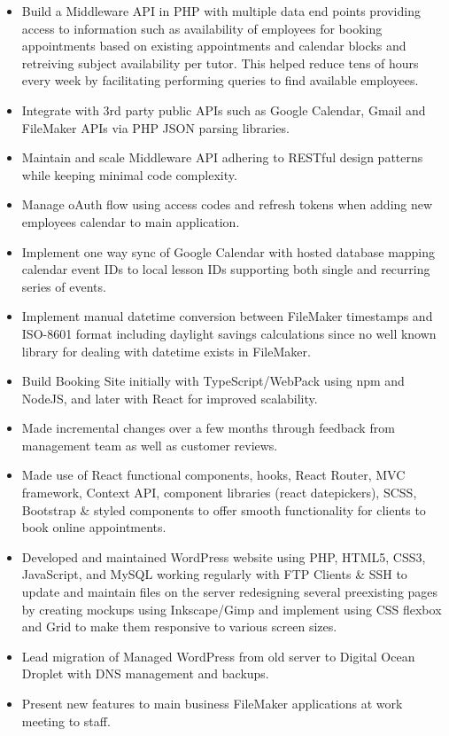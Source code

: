 \documentclass{resume}
\begin{document}
\begin{itemize}
\vspace{5pt}

\item \small \raggedright Build a Middleware API in PHP with multiple data end points providing access to information such as availability of employees for booking appointments based on existing appointments and calendar blocks and retreiving subject availability per tutor. This helped reduce tens of hours every week by facilitating performing queries to find available employees.
\item \small \raggedright Integrate with 3rd party public APIs such as Google Calendar, Gmail and FileMaker APIs via PHP JSON parsing libraries.
\item \small \raggedright Maintain and scale Middleware API adhering to RESTful design patterns while keeping minimal code complexity.
\item \small \raggedright Manage oAuth flow using access codes and refresh tokens when adding new employees calendar to main application.
\item \small \raggedright Implement one way sync of Google Calendar with hosted database mapping calendar event IDs to local lesson IDs supporting both single and recurring series of events.
\item \small \raggedright Implement manual datetime conversion between FileMaker timestamps and ISO-8601 format including daylight savings calculations since no well known library for dealing with datetime exists in FileMaker.

\vspace{5pt}

\item \small \raggedright Build Booking Site initially with TypeScript/WebPack using npm and NodeJS, and later with React for improved scalability.
\item \small \raggedright Made incremental changes over a few months through feedback from management team as well as customer reviews.
\item \small \raggedright Made use of React functional components, hooks, React Router, MVC framework, Context API, component libraries (react datepickers), SCSS, Bootstrap \& styled components to offer smooth functionality for clients to book online appointments.
\item \small \raggedright Developed and maintained WordPress website using PHP, HTML5, CSS3, JavaScript, and MySQL working regularly with FTP Clients \& SSH to update and maintain files on the server redesigning several preexisting pages by creating mockups using Inkscape/Gimp and implement using CSS flexbox and Grid to make them responsive to various screen sizes.
\item \small \raggedright Lead migration of Managed WordPress from old server to Digital Ocean Droplet with DNS management and backups.
\item \small \raggedright Present new features to main business FileMaker applications at work meeting to staff.
\end{itemize}
\end{document}
